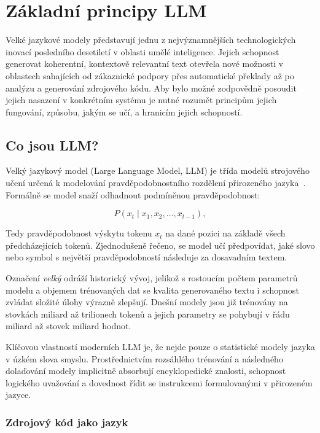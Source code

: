 \section{Základní principy LLM}
\label{sec:llm-principles}

Velké jazykové modely představují jednu z nejvýznamnějších technologických inovací posledního desetiletí v oblasti umělé inteligence.
Jejich schopnost generovat koherentní, kontextově relevantní text otevřela nové možnosti v oblastech sahajících od zákaznické podpory přes automatické překlady až po analýzu a generování zdrojového kódu.
Aby bylo možné zodpovědně posoudit jejich nasazení v konkrétním systému je nutné rozumět principům jejich fungování, způsobu, jakým se učí, a hranicím jejich schopností.

\subsection{Co jsou LLM?}
\label{subsec:llm-about}

Velký jazykový model (Large Language Model, LLM) je třída modelů strojového učení určená k modelování pravděpodobnostního rozdělení přirozeného jazyka~\cite{redhat-llm,jelodar-llmsourcecode}.
Formálně se model snaží odhadnout podmíněnou pravděpodobnost:

\begin{equation}
    P(x_t \mid x_1, x_2, \ldots, x_{t-1}), \label{eq:llm-probability}
\end{equation}

Tedy pravděpodobnost výskytu tokenu $x_t$ na dané pozici na základě všech předcházejících tokenů.
Zjednodušeně řečeno, se model učí předpovídat, jaké slovo nebo symbol s největší pravděpodobností následuje za dosavadním textem.

Označení \textit{velký} odráží historický vývoj, jelikož s rostoucím počtem parametrů modelu a objemem trénovaných dat se kvalita generovaného textu i schopnost zvládat složité úlohy výrazně zlepšují.
Dnešní modely jsou již trénovány na stovkách miliard až trilionech tokenů a jejich parametry se pohybují v řádu miliard až stovek miliard hodnot.

Klíčovou vlastností moderních LLM je, že nejde pouze o statistické modely jazyka v úzkém slova smyslu.
Prostřednictvím rozsáhlého trénování a následného dolaďování modely implicitně absorbují encyklopedické znalosti, schopnost logického uvažování a dovednost řídit se instrukcemi formulovanými v přirozeném jazyce.

\subsubsection*{Zdrojový kód jako jazyk}
\label{subsubsec:code-as-language}

